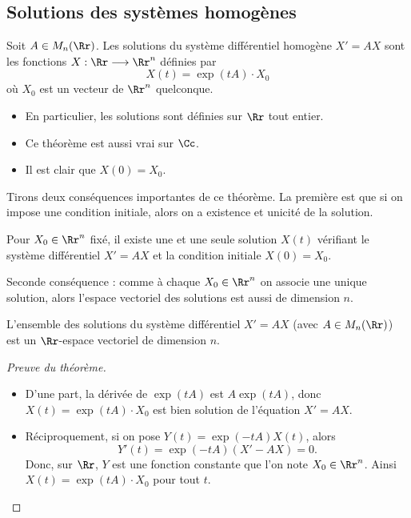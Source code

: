 \documentclass[12pt, class=report,crop=false]{standalone}
\begin{document}
\subsection{Solutions des systèmes homogènes}

\begin{theoreme}
\label{th:sysdiff}
Soit $A\in M_n(\Rr)$. Les solutions du système différentiel homogène $X'=AX$ sont
les fonctions 
$X:\Rr \longrightarrow \Rr^n$ définies 
par $$X(t) = \exp(tA) \cdot X_0$$
où $X_0$ est un vecteur de $\Rr^n$ quelconque.
\end{theoreme}


\begin{remarque*}
\sauteligne
\begin{itemize}
  \item En particulier, les solutions sont définies sur $\Rr$ tout entier.
  \item Ce théorème est aussi vrai sur $\Cc$.
  \item Il est clair que $X(0) = X_0$.
\end{itemize}
\end{remarque*}


\bigskip

Tirons deux conséquences importantes de ce théorème.
La première est que si on impose une condition initiale, alors on a existence et unicité de la solution.

\begin{corollaire}
\label{cor:sysdiffCL}
Pour $X_0 \in \Rr^n$ fixé, il existe une et une seule solution $X(t)$ vérifiant le système différentiel
$X' = A X$ et la condition initiale $X(0)=X_0$.
\end{corollaire}


Seconde conséquence : comme à chaque $X_0 \in \Rr^n$ on associe une unique solution, alors l'espace vectoriel des solutions est aussi de dimension $n$.
\begin{corollaire}
\label{cor:dimsysdiff}
L'ensemble des solutions du système différentiel $X' = A X$ (avec $A \in M_n(\Rr)$) 
est un $\Rr$-espace vectoriel de dimension $n$.
\end{corollaire}


\begin{proof}[Preuve du théorème]
~
\begin{itemize}
\item 
D'une part, la dérivée de $\exp(t A)$ est $A \exp(t A)$, donc $X(t) = \exp(tA) \cdot X_0$ est bien solution de l'équation $X' = AX$.
 
\item Réciproquement, si on pose $Y(t) = \exp(-tA)X(t)$, alors
\[Y'(t) = \exp (-tA) (X'-AX) = 0.\]
Donc, sur $\Rr$, $Y$ est une fonction constante que l'on note $X_0 \in \Rr^n$. Ainsi 
$X(t) = \exp(tA) \cdot X_0$ pour tout $t$. 
\end{itemize}
\end{proof}
\end{document}
